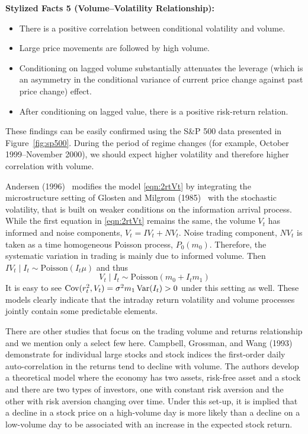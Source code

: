 \noindent\textbf{Stylized Facts 5 (Volume--Volatility Relationship):} 

        \begin{itemize}
        \item  There is a positive correlation between conditional volatility and volume.
        \item Large price movements are followed by high volume.
        \item Conditioning on lagged volume substantially attenuates the leverage (which is an asymmetry in the conditional variance of current price change against past price change) effect.
        \item After conditioning on lagged value, there is a positive risk-return relation.
        \end{itemize}


These findings can be easily confirmed using the S\&P 500 data presented in Figure~\ref{fig:sp500}. During the period of regime changes (for example, October 1999--November 2000), we should expect higher volatility and therefore higher correlation with volume. 


Andersen (1996)~\cite{andersen} modifies the model \eqref{eqn:2rtVt} by integrating the microstructure
setting of Glosten and Milgrom (1985)~\cite{glostenmilgrom} with the stochastic volatility, that is built on weaker conditions on the information arrival process. While the first equation in \eqref{eqn:2rtVt} remains the same, the volume $V_t$ has informed and noise components, $V_t = IV_t + NV_t$. Noise trading component, $NV_t$ is taken as a time homogeneous Poisson process, $P_0(m_0)$. Therefore, the systematic variation in trading is mainly due to informed volume. Then $IV_t \;|\; I_t \sim \text{Poisson}(I_t \mu)$ and thus
	\begin{equation}\label{eqn:2VtIt}
	V_t \;|\; I_t \sim \text{Poisson}(m_0 + I_t m_1)
	\end{equation}
It is easy to see $\operatorname{Cov}(r_t^2,V_t) = \sigma^2 m_1 \operatorname{Var}(I_t) > 0$ under this setting as well. These models clearly indicate that the intraday return volatility and volume processes jointly contain some predictable elements.


There are other studies that focus on the trading volume and returns relationship and we mention only a select few here. Campbell, Grossman, and Wang (1993)~\cite{campbellgross} demonstrate for individual large stocks and stock indices the first-order daily auto-correlation in the returns tend to decline with volume. The authors develop a theoretical model where the economy has two assets, risk-free asset and a stock and there are two types of investors, one with constant risk aversion and the other with risk aversion changing over time. Under this set-up, it is implied that a decline in a stock price on a high-volume day is more likely than a decline on a low-volume day to be associated with an increase in the expected stock return.


